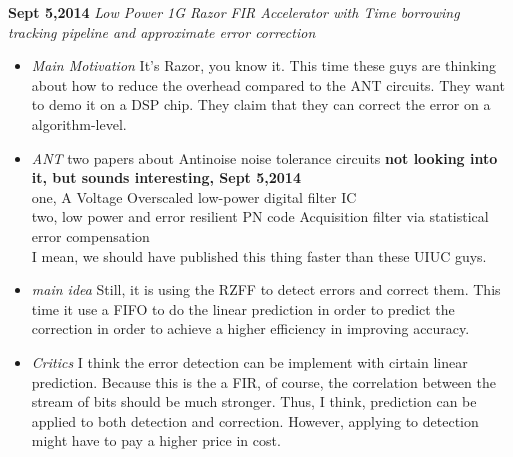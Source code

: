 \documentclass[]{article}
\begin{document}
\noindent \textbf{Sept 5,2014}
\textit{Low Power 1G Razor FIR Accelerator with Time borrowing tracking pipeline and approximate error correction}
\indent		\begin{itemize}

            \item \textit{Main Motivation} It's Razor, you know it.
            This time these guys are thinking about how to reduce the overhead compared to the ANT circuits.
            They want to demo it on a DSP chip.
            They claim that they can correct the error on a algorithm-level.

            \item \textit{ANT} two papers about Antinoise noise tolerance circuits \textbf{not looking into it, but sounds interesting, Sept 5,2014}\\
            one, A Voltage Overscaled low-power digital filter IC\\
            two, low power and error resilient PN code Acquisition filter via statistical error compensation\\
            I mean, we should have published this thing faster than these UIUC guys.

            \item \textit{main idea} Still, it is using the RZFF to detect errors and correct them. 
            This time it use a FIFO to do the linear prediction in order to predict the correction in order to achieve a higher efficiency in improving accuracy.
            
            \item \textit{Critics}   I think the error detection can be implement with cirtain linear prediction.
            Because this is the a FIR, of course, the correlation between the stream of bits should be much stronger.
            Thus, I think, prediction can be applied to both detection and correction.
            However, applying to detection might have to pay a higher price in cost. 

        \end{itemize}
\end{document}
